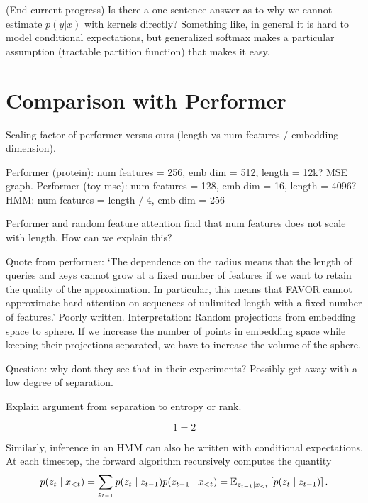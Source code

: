 \documentclass{article}
\begin{document}
(End current progress)
Is there a one sentence answer as to why we cannot estimate $p(y|x)$ with kernels directly?
Something like, in general it is hard to model conditional expectations, but
generalized softmax makes a particular assumption (tractable partition function)
that makes it easy.

\section{Comparison with Performer}
Scaling factor of performer versus ours (length vs num features / embedding dimension).

Performer (protein): num features = 256, emb dim = 512, length = 12k?
MSE graph.
Performer (toy mse): num features = 128, emb dim = 16, length = 4096?
HMM: num features = length / 4, emb dim = 256

Performer and random feature attention find that num features does not scale with
length. How can we explain this?

Quote from performer:
`The dependence on the radius means that the length of queries and keys cannot grow
at a fixed number of features if we want to
retain the quality of the approximation.
In particular, this means that FAVOR cannot approximate
hard attention on sequences of unlimited length with a fixed number of features.'
Poorly written.
Interpretation: Random projections from embedding space to sphere.
If we increase the number of points in embedding space while keeping
their projections separated, we have to increase the volume of the sphere.

Question: why dont they see that in their experiments?
Possibly get away with a low degree of separation.

Explain argument from separation to entropy or rank.

\begin{equation}
1 = 2
\end{equation}

Similarly, inference in an HMM can also be written with conditional expectations.
At each timestep, the forward algorithm recursively computes the quantity
\begin{equation}
\label{eqn:alpha}
p(z_t \mid x_{<t})
= \sum_{z_{t-1}} p(z_t \mid z_{t-1})p(z_{t-1}\mid x_{<t})
= \mathbb{E}_{z_{t-1}\mid x_{<t}}\left[p(z_t \mid z_{t-1})\right].
\end{equation}
\end{document}
